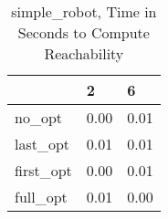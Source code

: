 \begin{table}
\caption{simple\_robot, Time in Seconds to Compute Reachability}
\label{simple_robot_states_time}
\begin{tabular}{lll}
\toprule
 & 2 & 6 \\
\midrule
no\_opt & 0.00 & 0.01 \\
last\_opt & 0.01 & 0.01 \\
first\_opt & 0.00 & 0.01 \\
full\_opt & 0.01 & 0.00 \\
\bottomrule
\end{tabular}
\end{table}
